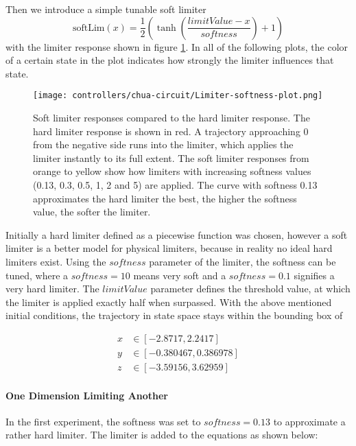 \documentclass[main]{subfiles}
\begin{document}
Then we introduce a simple tunable soft limiter \[\text{softLim}(x) = \frac{1}{2} \left(\tanh\left(\frac{limitValue - x}{softness}\right) + 1\right)\] with the limiter response shown in figure \ref{figure:softlimiterresponse}. %
%
In all of the following plots, the color of a certain state in the plot indicates how strongly the limiter influences that state.

\begin{figure}[H]
\centering
\texttt{[image: controllers/chua-circuit/Limiter-softness-plot.png]}
\caption[Soft limiter responses]{Soft limiter responses compared to the hard limiter response. The hard limiter response is shown in red. A trajectory approaching 0 from the negative side runs into the limiter, which applies the limiter instantly to its full extent. The soft limiter responses from orange to yellow show how limiters with increasing softness values (0.13, 0.3, 0.5, 1, 2 and 5) are applied. The curve with softness 0.13 approximates the hard limiter the best, the higher the softness value, the softer the limiter.}
\label{figure:softlimiterresponse}
\end{figure}

Initially a hard limiter defined as a piecewise function was chosen, however a soft limiter is a better model for physical limiters, because in reality no ideal hard limiters exist. %
%
Using the $softness$ parameter of the limiter, the softness can be tuned, where a \(softness = 10\) means very soft and a \(softness = 0.1\) signifies a very hard limiter. %
%
The $limitValue$ parameter defines the threshold value, at which the limiter is applied exactly half when surpassed. %
%
With the above mentioned initial conditions, the trajectory in state space stays within the bounding box of 

\begin{align*}
x &\in [-2.8717,2.2417]\\
y &\in [-0.380467,0.386978]\\
z &\in [-3.59156,3.62959]
\end{align*}

\paragraph{One Dimension Limiting Another}

In the first experiment, the softness was set to \(softness=0.13\) to approximate a rather hard limiter. The limiter is added to the equations as shown below:
\end{document}
